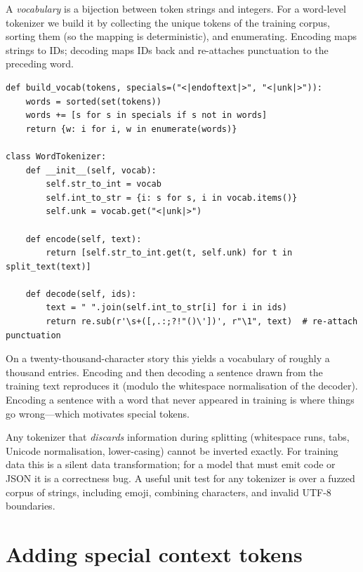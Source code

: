 A \emph{vocabulary} is a bijection between token strings and integers. For a word-level tokenizer
we build it by collecting the unique tokens of the training corpus, sorting them (so the mapping
is deterministic), and enumerating. Encoding maps strings to IDs; decoding maps IDs back and
re-attaches punctuation to the preceding word.

\begin{lstlisting}[caption={Vocabulary construction and a reversible word-level tokenizer.},label={lst:text:wordtok}]
def build_vocab(tokens, specials=("<|endoftext|>", "<|unk|>")):
    words = sorted(set(tokens))
    words += [s for s in specials if s not in words]
    return {w: i for i, w in enumerate(words)}

class WordTokenizer:
    def __init__(self, vocab):
        self.str_to_int = vocab
        self.int_to_str = {i: s for s, i in vocab.items()}
        self.unk = vocab.get("<|unk|>")

    def encode(self, text):
        return [self.str_to_int.get(t, self.unk) for t in split_text(text)]

    def decode(self, ids):
        text = " ".join(self.int_to_str[i] for i in ids)
        return re.sub(r'\s+([,.:;?!"()\'])', r"\1", text)  # re-attach punctuation
\end{lstlisting}

On a twenty-thousand-character story this yields a vocabulary of roughly a thousand entries.
Encoding and then decoding a sentence drawn from the training text reproduces it (modulo the
whitespace normalisation of the decoder). Encoding a sentence with a word that never appeared in
training is where things go wrong---which motivates special tokens.

\begin{pitfall}
Any tokenizer that \emph{discards} information during splitting (whitespace runs, tabs, Unicode
normalisation, lower-casing) cannot be inverted exactly. For training data this is a silent data
transformation; for a model that must emit code or JSON it is a correctness bug. A useful unit
test for any tokenizer is  over a fuzzed corpus of strings, including
emoji, combining characters, and invalid UTF-8 boundaries.
\end{pitfall}

\section{Adding special context tokens}\label{sec:text:special}

